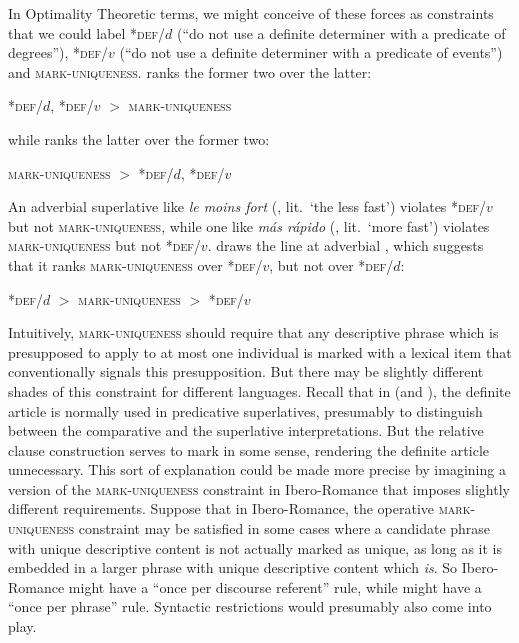 \documentclass[output=paper
,modfonts
,nonflat]{langsci/langscibook}
\begin{document}
In Optimality Theoretic terms, we might conceive of these forces as constraints that we could label *\textsc{def}/$d$ (``do not use a definite determiner with a predicate of degrees''), *\textsc{def}/$v$ (``do not use a definite determiner with a predicate of events'') and \textsc{mark-uniqueness}.   ranks the former two over the latter:
\begin{center}
*\textsc{def}/$d$,  *\textsc{def}/$v$  $>$ \textsc{mark-uniqueness}
\end{center}
while  ranks the latter over the former two:
\begin{center}
\textsc{mark-uniqueness} $>$ *\textsc{def}/$d$,  *\textsc{def}/$v$ 
\end{center}
An adverbial superlative like \textit{le moins fort} (, lit.\ `the less fast') violates *\textsc{def}/$v$ but not \textsc{mark-uniqueness}, while one like \textit{m\'as r\'apido} (, lit.\ `more fast') violates \textsc{mark-uniqueness} but not *\textsc{def}/$v$.  draws the line at adverbial , which suggests that it ranks \textsc{mark-uniqueness} over *\textsc{def}/$v$, but not over *\textsc{def}/$d$:
\begin{center}
*\textsc{def}/$d$ $>$ \textsc{mark-uniqueness} $>$  *\textsc{def}/$v$
\end{center}
Intuitively, \textsc{mark-uniqueness} should require that any descriptive phrase which is presupposed to apply to at most one individual is marked with a lexical item that conventionally signals this presupposition. But there may be slightly different shades of this constraint for different languages. Recall that in  (and ), the definite article is normally used in predicative superlatives, presumably to distinguish between the comparative and the superlative interpretations. But the relative clause construction serves to mark  in some sense, rendering the definite article unnecessary. This sort of explanation could be made more precise by imagining a version of the \textsc{mark-uniqueness} constraint in Ibero-Romance that imposes slightly different requirements. Suppose that in Ibero-Romance, the operative \textsc{mark-uniqueness} constraint may be satisfied in some cases where a candidate phrase with unique descriptive content is not actually marked as unique, as long as it is embedded in a larger phrase with unique descriptive content which \textit{is}. So Ibero-Romance might have a ``once per discourse referent'' rule, while  might have a ``once per phrase'' rule. Syntactic restrictions would presumably also come into play.
\end{document}
